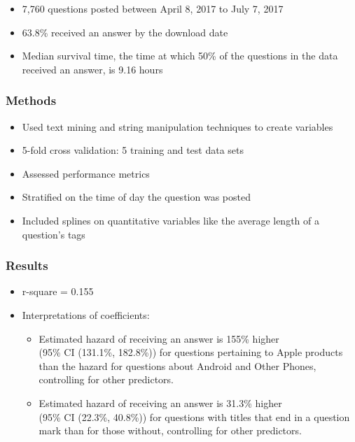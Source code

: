 \documentclass{beamer}
\begin{document}
\begin{frame}
\bigskip

  \begin{itemize}
      \item 7,760 questions posted between April 8, 2017 to July 7, 2017
      \item 63.8\% received an answer by the download date
      \item Median survival time, the time at which 50\% of the questions in the data received an answer, is 9.16 hours
  \end{itemize}
  
\end{frame}

\begin{frame}
\frametitle{Methods}
  
  \begin{itemize}
      \item Used text mining and string manipulation techniques to create variables
      \item 5-fold cross validation: 5 training and test data sets 
      \item Assessed performance metrics
      \item Stratified on the time of day the question was posted
      \item Included splines on quantitative variables like the average length of a question's tags
  \end{itemize}
  
\end{frame}

\begin{frame}
\frametitle{Results}

  \begin{itemize}
      \item r-square = 0.155
  \bigskip
      \item Interpretations of coefficients:
      \begin{itemize}
          \bigskip
          \item Estimated hazard of receiving an answer is 155\% higher \\ (95\% CI (131.1\%, 182.8\%)) 
          for questions pertaining to Apple products than the hazard for questions about Android and Other Phones,
          controlling for other predictors.
          \bigskip
          \item Estimated hazard of receiving an answer is 31.3\% higher \\ (95\% CI (22.3\%, 40.8\%)) 
          for questions with titles that end in a question mark than for those without, 
          controlling for other predictors.
          
      \end{itemize}
  \end{itemize}
  
\end{frame}
\end{document}
